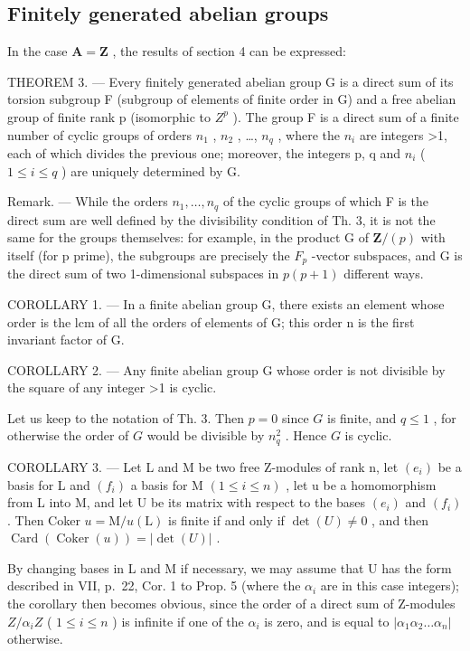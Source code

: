 \subsection{Finitely generated abelian groups}

In the case \(\mathbf{A} = \mathbf{Z}\) , the results of section 4 can be expressed:

THEOREM 3. --- Every finitely generated abelian group G is a direct sum of its torsion subgroup F (subgroup of elements of finite order in G) and a free abelian group of finite rank p (isomorphic to \(Z^{p}\) ). The group F is a direct sum of a finite number of cyclic groups of orders \(n_{1}\) , \(n_{2}\) , \ldots, \(n_{q}\) , where the \(n_{i}\) are integers \textgreater1, each of which divides the previous one; moreover, the integers p, q and \(n_{i}\) ( \(1 \leq i \leq q\) ) are uniquely determined by G.

Remark. --- While the orders \(n_{1}, \ldots, n_{q}\) of the cyclic groups of which F is the direct sum are well defined by the divisibility condition of Th. 3, it is not the same for the groups themselves: for example, in the product G of \(\mathbf{Z}/(p)\) with itself (for p prime), the subgroups are precisely the \(F_{p}\) -vector subspaces, and G is the direct sum of two 1-dimensional subspaces in \(p(p+1)\) different ways.

COROLLARY 1. --- In a finite abelian group G, there exists an element whose order is the lcm of all the orders of elements of G; this order n is the first invariant factor of G.

COROLLARY 2. --- Any finite abelian group G whose order is not divisible by the square of any integer \textgreater1 is cyclic.

Let us keep to the notation of Th. 3. Then \(p = 0\) since \(G\) is finite, and \(q \leqslant 1\) , for otherwise the order of \(G\) would be divisible by \(n_q^2\) . Hence \(G\) is cyclic.

COROLLARY 3. --- Let L and M be two free Z-modules of rank n, let \((e_{i})\) be a basis for L and \((f_{i})\) a basis for M \((1 \leqslant i \leqslant n)\) , let u be a homomorphism from L into M, and let U be its matrix with respect to the bases \((e_{i})\) and \((f_{i})\) . Then Coker \(u = \mathrm{M}/u(\mathrm{L})\) is finite if and only if \(\det(U) \neq 0\) , and then \(\operatorname{Card}(\operatorname{Coker}(u)) = |\det(U)|\) .

By changing bases in L and M if necessary, we may assume that U has the form described in VII, p.~22, Cor. 1 to Prop. 5 (where the \(\alpha_{i}\) are in this case integers); the corollary then becomes obvious, since the order of a direct sum of Z-modules \(Z/\alpha_{i}Z\) ( \(1 \leqslant i \leqslant n\) ) is infinite if one of the \(\alpha_{i}\) is zero, and is equal to \(|\alpha_{1}\alpha_{2} \ldots \alpha_{n}|\) otherwise.

